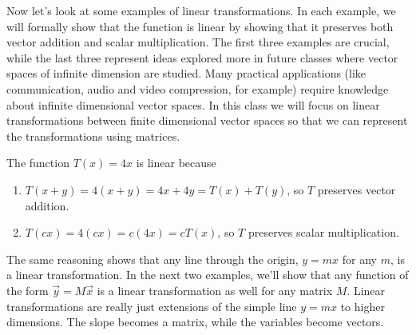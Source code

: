 Now let's look at some examples of linear transformations.  In each example, we will formally show that the function is linear by showing that it preserves both vector addition and scalar multiplication.  The first three examples are crucial, while the last three represent ideas explored more in future classes where vector spaces of infinite dimension are studied.  Many practical applications (like communication, audio and video compression, for example) require knowledge about infinite dimensional vector spaces.  In this class we will focus on linear transformations between finite dimensional vector spaces so that we can represent the transformations using matrices.

\begin{example}
%
The function $T(x)=4x$ is linear because
\begin{enumerate}
\item $T(x+y) = 4(x+y) = 4x+4y = T(x)+T(y)$, so $T$ preserves vector addition.
\item $T(cx)=4(cx)=c(4x)=cT(x)$, so $T$ preserves scalar multiplication.
\end{enumerate}
\end{example}

The same reasoning shows that any line through the origin, $y=mx$ for any $m$, is a linear transformation. In the next two examples, we'll show that any function of the form $\vec y = M\vec x$ is a linear transformation as well for any matrix $M$.   Linear transformations are really just extensions of the simple line $y=mx$ to higher dimensions. The slope becomes a matrix, while the variables become vectors.

